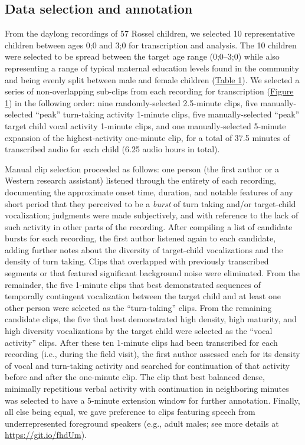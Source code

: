 \documentclass[
  english,
  ,man,floatsintext]{apa6}
\begin{document}
\hypertarget{methods-samples}{%
\subsection{Data selection and annotation}\label{methods-samples}}

From the daylong recordings of 57 Rossel children, we selected 10 representative children between ages 0;0 and 3;0 for transcription and analysis. The 10 children were selected to be spread between the target age range (0;0--3;0) while also representing a range of typical maternal education levels found in the community and being evenly split between male and female children (\protect\hyperlink{tab1}{Table 1}). We selected a series of non-overlapping sub-clips from each recording for transcription (\protect\hyperlink{fig1}{Figure 1}) in the following order: nine randomly-selected 2.5-minute clips, five manually-selected \enquote{peak} turn-taking activity 1-minute clips, five manually-selected \enquote{peak} target child vocal activity 1-minute clips, and one manually-selected 5-minute expansion of the highest-activity one-minute clip, for a total of 37.5 minutes of transcribed audio for each child (6.25 audio hours in total).

Manual clip selection proceeded as follows: one person (the first author or a Western research assistant) listened through the entirety of each recording, documenting the approximate onset time, duration, and notable features of any short period that they perceived to be a \emph{burst} of turn taking and/or target-child vocalization; judgments were made subjectively, and with reference to the lack of such activity in other parts of the recording. After compiling a list of candidate bursts for each recording, the first author listened again to each candidate, adding further notes about the diversity of target-child vocalizations and the density of turn taking. Clips that overlapped with previously transcribed segments or that featured significant background noise were eliminated. From the remainder, the five 1-minute clips that best demonstrated sequences of temporally contingent vocalization between the target child and at least one other person were selected as the \enquote{turn-taking} clips. From the remaining candidate clips, the five that best demonstrated high density, high maturity, and high diversity vocalizations by the target child were selected as the \enquote{vocal activity} clips. After these ten 1-minute clips had been transcribed for each recording (i.e., during the field visit), the first author assessed each for its density of vocal and turn-taking activity and searched for continuation of that activity before and after the one-minute clip. The clip that best balanced dense, minimally repetitious verbal activity with continuation in neighboring minutes was selected to have a 5-minute extension window for further annotation. Finally, all else being equal, we gave preference to clips featuring speech from underrepresented foreground speakers (e.g., adult males; see more details at \url{https://git.io/fhdUm}).
\end{document}
